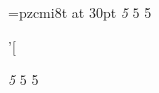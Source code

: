 \documentclass{book}
\begin{document}
{
    {
        \font\myft=pzcmi8t at 30pt
         \textit{5} $5$ 5\par'[
    }
    \fontsize{30}{30}
    \textit{5} $5$ 5
}
\end{document}
